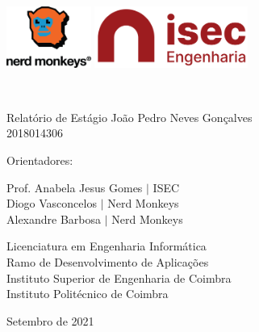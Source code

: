 
\begin{titlepage}
    
    \noindent
        \includegraphics[height=2cm]{images/NMlogo_colour.png} 
        \hfill{}
        \includegraphics[height=2cm]{images/logo-isec-transparente.png}
        
        \begin{center}
        \begin{large}
            \vfill{}
            \textbf{\huge{\mytitle{}}}\\
            \vspace{10px}
            
            \begin{Large}
                
                Relatório de Estágio
                \vfill
                João Pedro Neves Gonçalves\\
                2018014306
                
            \end{Large}
            \vfill
            Orientadores:

            Prof. Anabela Jesus Gomes  \(|\) ISEC\\
            Diogo Vasconcelos \(|\) Nerd Monkeys\\
            Alexandre Barbosa \(|\) Nerd Monkeys

            \vfill
            Licenciatura em Engenharia Informática\\
            Ramo de Desenvolvimento de Aplicações\\
            Instituto Superior de Engenharia de Coimbra\\
            Instituto Politécnico de Coimbra
            
           \vfill{}
            Setembro de 2021
        \end{large}
    \end{center}
\end{titlepage}
